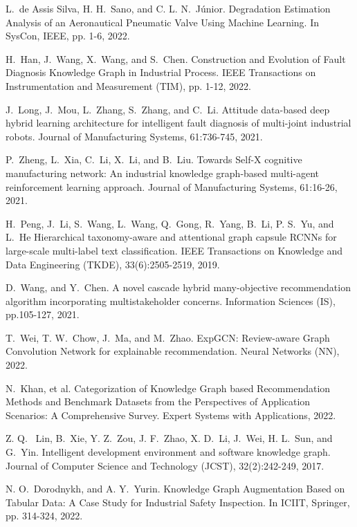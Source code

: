 \documentclass[11pt]{article}
\begin{document}
\begin{thebibliography}{10}
\begin{small}
 L.~de Assis Silva, H. H.~Sano, and C. L. N.~Júnior. \newblock Degradation Estimation Analysis of an Aeronautical Pneumatic Valve Using Machine Learning. \newblock In SysCon, IEEE, pp. 1-6, 2022.

 H.~Han, J.~Wang, X.~Wang, and S.~Chen. \newblock Construction and Evolution of Fault Diagnosis Knowledge Graph in Industrial Process. \newblock IEEE Transactions on Instrumentation and Measurement (TIM), pp. 1-12, 2022.

 J.~Long, J.~Mou, L.~Zhang, S.~Zhang, and C.~Li. \newblock Attitude data-based deep hybrid learning architecture for intelligent fault diagnosis of multi-joint industrial robots. \newblock Journal of Manufacturing Systems, 61:736-745, 2021.

 P.~Zheng, L.~Xia, C.~Li, X.~Li, and B.~Liu. \newblock  Towards Self-X cognitive manufacturing network: An industrial knowledge graph-based multi-agent reinforcement learning approach. \newblock Journal of Manufacturing Systems, 61:16-26, 2021.


 H.~Peng, J.~Li, S.~Wang, L.~Wang, Q.~Gong, R.~Yang, B.~Li, P. S.~Yu, and L.~He \newblock Hierarchical taxonomy-aware and attentional graph capsule RCNNs for large-scale multi-label text classification. \newblock IEEE Transactions on Knowledge and Data Engineering (TKDE), 33(6):2505-2519, 2019.

 D.~Wang, and Y.~Chen. \newblock A novel cascade hybrid many-objective recommendation algorithm incorporating multistakeholder concerns. \newblock Information Sciences (IS), pp.105-127, 2021.

 T.~Wei, T. W.~Chow, J.~Ma, and M.~Zhao. \newblock ExpGCN: Review-aware Graph Convolution Network for explainable recommendation. \newblock Neural Networks (NN), 2022.

 N.~Khan, et al. \newblock Categorization of Knowledge Graph based Recommendation Methods and Benchmark Datasets from the Perspectives of Application Scenarios: A Comprehensive Survey. \newblock Expert Systems with Applications, 2022.

 Z. Q. ~Lin, B.~Xie, Y. Z.~Zou, J. F.~Zhao, X. D.~Li, J.~Wei, H. L.~Sun, and G.~Yin. \newblock Intelligent development environment and software knowledge graph. \newblock Journal of Computer Science and Technology (JCST), 32(2):242-249, 2017.

 N. O.~Dorodnykh, and A. Y.~Yurin. \newblock Knowledge Graph Augmentation Based on Tabular Data: A Case Study for Industrial Safety Inspection. \newblock In ICIIT, Springer, pp. 314-324, 2022.


\end{small}
\end{thebibliography}
\end{document}
